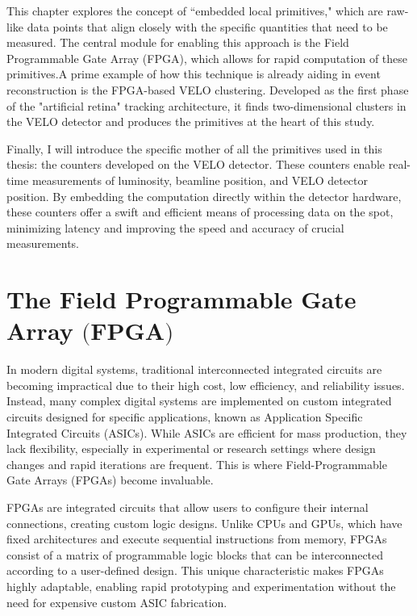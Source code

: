 This chapter explores the concept of ``embedded local primitives," which are raw-like data points that align closely with the specific quantities that need to be measured. The central module for enabling this approach is the Field Programmable Gate Array (FPGA), which allows for rapid computation of these primitives.A prime example of how this technique is already aiding in event reconstruction is the FPGA-based VELO clustering. Developed as the first phase of the "artificial retina" tracking architecture, it finds two-dimensional clusters in the VELO detector and produces the primitives at the heart of this study.

Finally, I will introduce the specific mother of all the primitives used in this thesis: the counters developed on the VELO detector. These counters enable real-time measurements of luminosity, beamline position, and VELO detector position. By embedding the computation directly within the detector hardware, these counters offer a swift and efficient means of processing data on the spot, minimizing latency and improving the speed and accuracy of crucial measurements. 


\section[The Field Programmable Gate Array]{The Field Programmable Gate Array $\bigl($FPGA$\bigr)$}

In modern digital systems, traditional interconnected integrated circuits are becoming impractical due to their high cost, low efficiency, and reliability issues. Instead, many complex digital systems are implemented on custom integrated circuits designed for specific applications, known as Application Specific Integrated Circuits (ASICs). While ASICs are efficient for mass production, they lack flexibility, especially in experimental or research settings where design changes and rapid iterations are frequent. This is where Field-Programmable Gate Arrays (FPGAs) become invaluable.

FPGAs are integrated circuits that allow users to configure their internal connections, creating custom logic designs. Unlike CPUs and GPUs, which have fixed architectures and execute sequential instructions from memory, FPGAs consist of a matrix of programmable logic blocks that can be interconnected according to a user-defined design. This unique characteristic makes FPGAs highly adaptable, enabling rapid prototyping and experimentation without the need for expensive custom ASIC fabrication.

